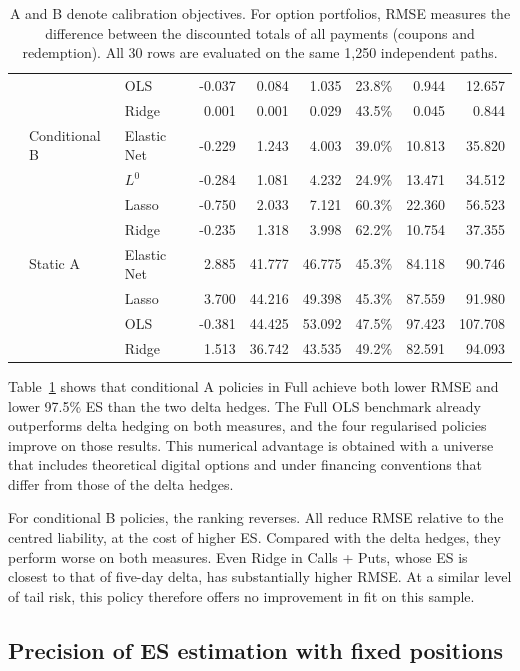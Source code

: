 \documentclass[12pt,a4paper]{article}
\newcommand{\1}{\mathbf{1}}
\begin{document}
\begin{table}[H]
{\begin{tabular}{lllrrrrrr}
 &  & OLS & -0.037 & 0.084 & 1.035 & 23.8\% & 0.944 & 12.657 \\
 &  & Ridge & 0.001 & 0.001 & 0.029 & 43.5\% & 0.045 & 0.844 \\
\addlinespace[2pt]
 & Conditional B & Elastic Net & -0.229 & 1.243 & 4.003 & 39.0\% & 10.813 & 35.820 \\
 &  & $L^0$ & -0.284 & 1.081 & 4.232 & 24.9\% & 13.471 & 34.512 \\
 &  & Lasso & -0.750 & 2.033 & 7.121 & 60.3\% & 22.360 & 56.523 \\
 &  & Ridge & -0.235 & 1.318 & 3.998 & 62.2\% & 10.754 & 37.355 \\
\addlinespace[2pt]
 & Static A & Elastic Net & 2.885 & 41.777 & 46.775 & 45.3\% & 84.118 & 90.746 \\
 &  & Lasso & 3.700 & 44.216 & 49.398 & 45.3\% & 87.559 & 91.980 \\
 &  & OLS & -0.381 & 44.425 & 53.092 & 47.5\% & 97.423 & 107.708 \\
 &  & Ridge & 1.513 & 36.742 & 43.535 & 49.2\% & 82.591 & 94.093 \\
\bottomrule
\end{tabular}}
\caption{A and B denote calibration objectives. For option portfolios, RMSE measures the difference between the discounted totals of all payments (coupons and redemption). All 30 rows are evaluated on the same 1,250 independent paths.}
\label{tab:unified-comparison}
\end{table}

Table~\ref{tab:unified-comparison} shows that conditional A policies in Full achieve both lower RMSE and lower 97.5\% ES than the two delta hedges. The Full OLS benchmark already outperforms delta hedging on both measures, and the four regularised policies improve on those results. This numerical advantage is obtained with a universe that includes theoretical digital options and under financing conventions that differ from those of the delta hedges.

For conditional B policies, the ranking reverses. All reduce RMSE relative to the centred liability, at the cost of higher ES. Compared with the delta hedges, they perform worse on both measures. Even Ridge in Calls + Puts, whose ES is closest to that of five-day delta, has substantially higher RMSE. At a similar level of tail risk, this policy therefore offers no improvement in fit on this sample.

\subsection{Precision of ES estimation with fixed positions}
\end{document}
